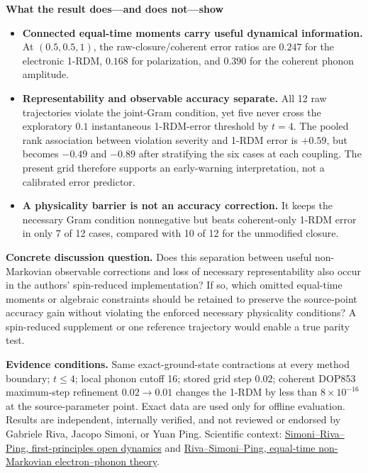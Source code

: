 \documentclass[10pt]{article}
\begin{document}
\vspace{3pt}
{\large\bfseries\color{memoBlue}What the result does---and does not---show}

\begin{itemize}
  \item \textbf{Connected equal-time moments carry useful dynamical
  information.}  At $(0.5,0.5,1)$, the raw-closure/coherent error ratios are
  $0.247$ for the electronic 1-RDM, $0.168$ for polarization, and $0.390$ for
  the coherent phonon amplitude.
  \item \textbf{Representability and observable accuracy separate.}  All 12
  raw trajectories violate the joint-Gram condition, yet five never cross the
  exploratory $0.1$ instantaneous 1-RDM-error threshold by $t=4$.  The pooled
  rank association between violation severity and 1-RDM error is $+0.59$, but
  becomes $-0.49$ and $-0.89$ after stratifying the six cases at each coupling.
  The present grid therefore supports an early-warning interpretation, not a
  calibrated error predictor.
  \item \textbf{A physicality barrier is not an accuracy correction.}  It keeps
  the necessary Gram condition nonnegative but beats coherent-only 1-RDM error
  in only 7 of 12 cases, compared with 10 of 12 for the unmodified closure.
\end{itemize}

\noindent\colorbox{memoWarm}{%
  \parbox{0.972\linewidth}{%
  \textbf{Concrete discussion question.}  Does this separation between
  useful non-Markovian observable corrections and loss of necessary
  representability also occur in the authors' spin-reduced implementation?
  If so, which omitted equal-time moments or algebraic constraints should be
  retained to preserve the source-point accuracy gain without violating the
  enforced necessary physicality conditions?  A spin-reduced supplement or
  one reference trajectory would enable a true parity test.}}

\vspace{3pt}
{\scriptsize
\textbf{Evidence conditions.} Same exact-ground-state contractions at every
method boundary; $t\le4$; local phonon cutoff 16; stored grid step $0.02$;
coherent DOP853 maximum-step refinement $0.02\to0.01$ changes the 1-RDM by less
than $8\times10^{-16}$ at the source-parameter point.  Exact data are used only
for offline evaluation.  Results are independent, internally verified, and
not reviewed or endorsed by Gabriele Riva, Jacopo Simoni, or Yuan Ping.
Scientific context:
\href{https://arxiv.org/html/2504.17936v2}{Simoni--Riva--Ping, first-principles
open dynamics} and
\href{https://arxiv.org/html/2606.22233v1}{Riva--Simoni--Ping, equal-time
non-Markovian electron--phonon theory}.}
\end{document}
